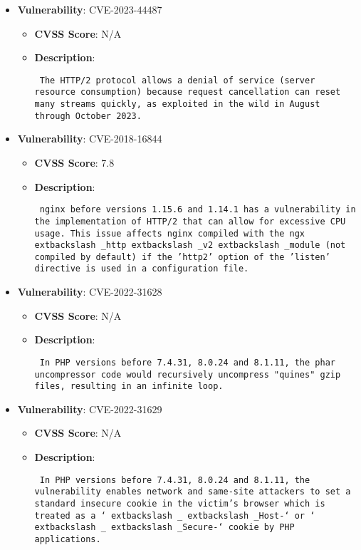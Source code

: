 \documentclass{article}
\begin{document}
\begin{itemize}
    
        \item \textbf{Vulnerability}: CVE-2023-44487
        \begin{itemize}
            \item \textbf{CVSS Score}:  N/A 
            \item \textbf{Description}: \parbox{\linewidth}{\texttt{ The HTTP/2 protocol allows a denial of service (server resource consumption) because request cancellation can reset many streams quickly, as exploited in the wild in August through October 2023. }}
        \end{itemize}
    
        \item \textbf{Vulnerability}: CVE-2018-16844
        \begin{itemize}
            \item \textbf{CVSS Score}:  7.8 
            \item \textbf{Description}: \parbox{\linewidth}{\texttt{ nginx before versions 1.15.6 and 1.14.1 has a vulnerability in the implementation of HTTP/2 that can allow for excessive CPU usage. This issue affects nginx compiled with the ngx	extbackslash _http	extbackslash _v2	extbackslash _module (not compiled by default) if the 'http2' option of the 'listen' directive is used in a configuration file. }}
        \end{itemize}
    
        \item \textbf{Vulnerability}: CVE-2022-31628
        \begin{itemize}
            \item \textbf{CVSS Score}:  N/A 
            \item \textbf{Description}: \parbox{\linewidth}{\texttt{ In PHP versions before 7.4.31, 8.0.24 and 8.1.11, the phar uncompressor code would recursively uncompress "quines" gzip files, resulting in an infinite loop. }}
        \end{itemize}
    
        \item \textbf{Vulnerability}: CVE-2022-31629
        \begin{itemize}
            \item \textbf{CVSS Score}:  N/A 
            \item \textbf{Description}: \parbox{\linewidth}{\texttt{ In PHP versions before 7.4.31, 8.0.24 and 8.1.11, the vulnerability enables network and same-site attackers to set a standard insecure cookie in the victim's browser which is treated as a `	extbackslash _	extbackslash _Host-` or `	extbackslash _	extbackslash _Secure-` cookie by PHP applications. }}
        \end{itemize}
    

\end{itemize}
\end{document}
